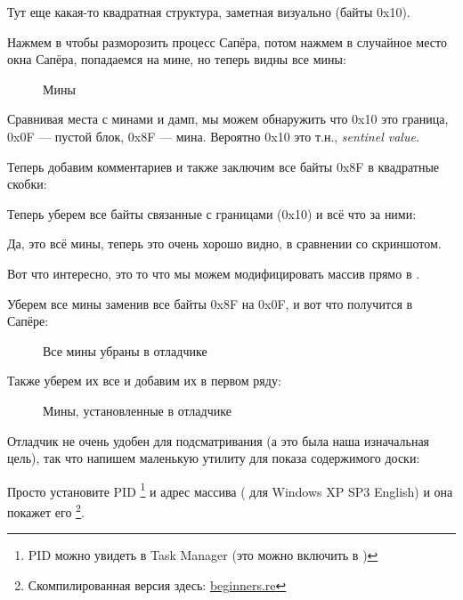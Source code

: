 Тут еще какая-то квадратная структура, заметная визуально (байты 0x10).

Нажмем  в \olly чтобы разморозить процесс Сапёра, потом нажмем в случайное место окна Сапёра, попадаемся на мине, но теперь
видны все мины:

\begin{figure}[H]
\centering
{}
\caption{Мины}
\label{fig:minesweeper1}
\end{figure}

Сравнивая места с минами и дамп, мы можем обнаружить что 0x10 это граница, 0x0F --- пустой блок, 
0x8F --- мина.
Вероятно 0x10 это т.н., \emph{sentinel value}.

Теперь добавим комментариев и также заключим все байты 0x8F в квадратные скобки:%



Теперь уберем все байты связанные с границами (0x10) и всё что за ними:%



Да, это всё мины, теперь это очень хорошо видно, в сравнении со скриншотом.

\clearpage
Вот что интересно, это то что мы можем модифицировать массив прямо в \olly.%

Уберем все мины заменив все байты 0x8F на 0x0F, и вот что получится в Сапёре:

\begin{figure}[H]
\centering
{}
\caption{Все мины убраны в отладчике}
\label{fig:minesweeper3}
\end{figure}

Также уберем их все и добавим их в первом ряду: 

\begin{figure}[H]
\centering
{}
\caption{Мины, установленные в отладчике}
\label{fig:minesweeper2}
\end{figure}

Отладчик не очень удобен для подсматривания (а это была наша изначальная цель), так что напишем маленькую
утилиту для показа содержимого доски:



Просто установите \ac{PID}
\footnote{PID можно увидеть в Task Manager 
(это можно включить в )} 
и адрес массива ( для Windows XP SP3 English) 
и она покажет его
\footnote{Скомпилированная версия здесь: 
\href{http://go.yurichev.com/17165}{beginners.re}}.

